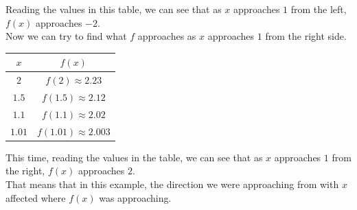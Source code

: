 \documentclass{article}
\begin{document}
Reading the values in this table, we can see that as $x$ approaches $1$ from the left, $f(x)$ approaches $-2$.
\\Now we can try to find what $f$ approaches as $x$ approaches $1$ from the right side.
\begin{center}
    \begin{tabular}{ c|c }
        $x$ & $f(x)$\\
        \hline
        $2$ & $f(2) \approx 2.23$\\
        $1.5$ & $f(1.5) \approx 2.12$\\
        $1.1$ & $f(1.1) \approx 2.02$\\
        $1.01$ & $f(1.01) \approx 2.003$
    \end{tabular}
\end{center}
This time, reading the values in the table, we can see that as $x$ approaches $1$ from the right, $f(x)$
approaches $2$.
\\That means that in this example, the direction we were approaching from with $x$ affected where
$f(x)$ was approaching.
\end{document}
